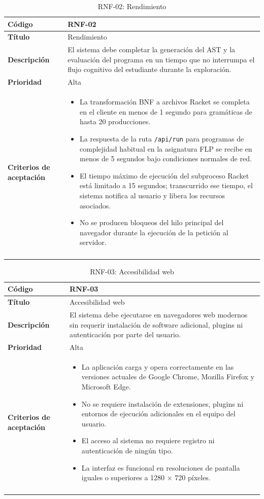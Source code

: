 \begin{longtable}{|>{\bfseries}p{3cm}|p{11cm}|}
\hline
\textbf{Código} & RNF-02 \\
\hline
\textbf{Título} & Rendimiento \\
\hline
\textbf{Descripción} & El sistema debe completar la generación del AST y la evaluación del programa en un tiempo que no interrumpa el flujo cognitivo del estudiante durante la exploración. \\
\hline
\textbf{Prioridad} & Alta \\
\hline
\textbf{Criterios de aceptación} &
\begin{itemize}[leftmargin=*,topsep=2pt,itemsep=1pt,parsep=0pt]
    \item La transformación BNF a archivos Racket se completa en el cliente en menos de 1 segundo para gramáticas de hasta 20 producciones.
    \item La respuesta de la ruta \texttt{/api/run} para programas de complejidad habitual en la asignatura FLP se recibe en menos de 5 segundos bajo condiciones normales de red.
    \item El tiempo máximo de ejecución del subproceso Racket está limitado a 15 segundos; transcurrido ese tiempo, el sistema notifica al usuario y libera los recursos asociados.
    \item No se producen bloqueos del hilo principal del navegador durante la ejecución de la petición al servidor.
\end{itemize} \\
\hline
\caption{RNF-02: Rendimiento}
\label{tab:rnf02}
\end{longtable}

\begin{longtable}{|>{\bfseries}p{3cm}|p{11cm}|}
\hline
\textbf{Código} & RNF-03 \\
\hline
\textbf{Título} & Accesibilidad web \\
\hline
\textbf{Descripción} & El sistema debe ejecutarse en navegadores web modernos sin requerir instalación de software adicional, plugins ni autenticación por parte del usuario. \\
\hline
\textbf{Prioridad} & Alta \\
\hline
\textbf{Criterios de aceptación} &
\begin{itemize}[leftmargin=*,topsep=2pt,itemsep=1pt,parsep=0pt]
    \item La aplicación carga y opera correctamente en las versiones actuales de Google Chrome, Mozilla Firefox y Microsoft Edge.
    \item No se requiere instalación de extensiones, plugins ni entornos de ejecución adicionales en el equipo del usuario.
    \item El acceso al sistema no requiere registro ni autenticación de ningún tipo.
    \item La interfaz es funcional en resoluciones de pantalla iguales o superiores a 1280 × 720 píxeles.
\end{itemize} \\
\hline
\caption{RNF-03: Accesibilidad web}
\label{tab:rnf03}
\end{longtable}

